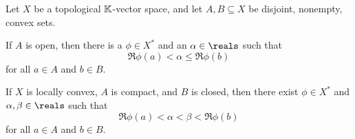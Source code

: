 \documentclass[article, a4paper, 11pt, oneside]{memoir}
\numberwithin{equation}{chapter}
\begin{document}
\begin{theorem}
    \label{thm:Hahn-Banach-separation}
    Let $X$ be a topological $\mathbb{K}$-vector space, and let $A,B \subseteq X$ be disjoint, nonempty, convex sets.
    \begin{enumthm}
        \item \label{enum:Hahn-Banach-separation-open} If $A$ is open, then there is a $\phi \in X^*$ and an $\alpha \in \reals$ such that
        \begin{equation*}
            \Re \phi(a)
                < \alpha
                \leq \Re \phi(b)
        \end{equation*}
        for all $a \in A$ and $b \in B$.

        \item \label{enum:Hahn-Banach-separation-compact-closed} If $X$ is locally convex, $A$ is compact, and $B$ is closed, then there exist $\phi \in X^*$ and $\alpha,\beta \in \reals$ such that
        \begin{equation*}
            \Re \phi(a)
                < \alpha
                < \beta
                < \Re \phi(b)
        \end{equation*}
        for all $a \in A$ and $b \in B$.
    \end{enumthm}
\end{theorem}
\end{document}
